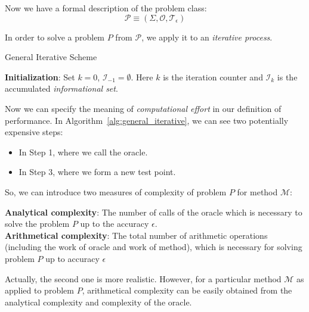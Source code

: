 Now we have a formal description of the problem class:
\[
    \mathscr{P} \equiv (\Sigma, \mathcal{O}, \mathscr{T}_\epsilon)    
\]

In order to solve a problem \(P\) from \(\mathscr{P}\), we apply it to an \emph{iterative process}.
\begin{algorithm}[!htbp]
    \caption{General Iterative Scheme}\label{alg:general_iterative}
    \textbf{Initialization}: Set \(k = 0\), \(\mathscr{I}_{-1} = \emptyset\). Here \(k\) is the iteration counter and \(\mathscr{I}_k\) is the accumulated \emph{informational set}.\\
\end{algorithm}

Now we can specify the meaning of \emph{computational effort} in our definition of performance. In Algorithm~\ref{alg:general_iterative}, we can see two potentially expensive steps:
\begin{itemize}
    \item In Step 1, where we call the oracle.
    \item In Step 3, where we form a new test point.
\end{itemize}
So, we can introduce two measures of complexity of problem \(P\) for method \(\mathscr{M}\):
\begin{defn}\label{defn:complexity}
\textbf{{Analytical complexity}}: The number of calls of the oracle which is necessary to solve the problem \(P\) up to the accuracy \(\epsilon\).\\
\textbf{{Arithmetical complexity}}: The total number of arithmetic operations (including the work of oracle and work of method), which is necessary for solving problem \(P\) up to accuracy \(\epsilon\)
\end{defn}

Actually, the second one is more realistic. However, for a particular method \(\mathscr{M}\) as applied to problem \(P\), arithmetical complexity can be easily obtained from the analytical complexity and complexity of the oracle.

